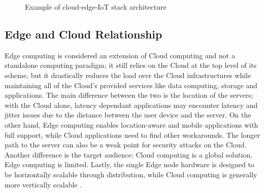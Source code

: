 \begin{figure}[ht]
    \centering
    \caption{Example of cloud-edge-IoT stack architecture}
    \label{fig:ceiot_stack}
\end{figure}

\subsection{Edge and Cloud Relationship}
Edge computing is considered an extension of Cloud computing and not a standalone computing paradigm; it still relies on the Cloud at the top level of its scheme, but it drastically reduces the load over the Cloud infrastructures while maintaining all of the Cloud's provided services like data computing, storage and applications. The main difference between the two is the location of the servers; with the Cloud alone, latency dependant applications may encounter latency and jitter issues due to the distance between the user device and the server. On the other hand, Edge computing enables location-aware and mobile applications with full support, while Cloud applications need to find other workarounds. The longer path to the server can also be a weak point for security attacks on the Cloud. Another difference is the target audience: Cloud computing is a global solution, Edge computing is limited. Lastly, the single Edge node hardware is designed to be horizontally scalable through distribution, while Cloud computing is generally more vertically scalable \cite{khan2019edge}.


